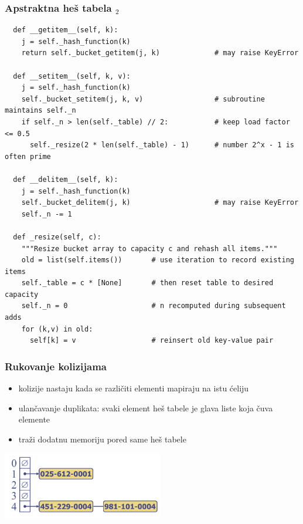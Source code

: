 \documentclass[compress,aspectratio=169]{beamer}
\begin{document}
\begin{frame}
  \frametitle{Apstraktna heš tabela $_2$}
\begin{verbatim}
  def __getitem__(self, k):
    j = self._hash_function(k)
    return self._bucket_getitem(j, k)             # may raise KeyError

  def __setitem__(self, k, v):
    j = self._hash_function(k)
    self._bucket_setitem(j, k, v)                 # subroutine maintains self._n
    if self._n > len(self._table) // 2:           # keep load factor <= 0.5
      self._resize(2 * len(self._table) - 1)      # number 2^x - 1 is often prime

  def __delitem__(self, k):
    j = self._hash_function(k)
    self._bucket_delitem(j, k)                    # may raise KeyError
    self._n -= 1

  def _resize(self, c):
    """Resize bucket array to capacity c and rehash all items."""
    old = list(self.items())       # use iteration to record existing items
    self._table = c * [None]       # then reset table to desired capacity
    self._n = 0                    # n recomputed during subsequent adds
    for (k,v) in old:
      self[k] = v                  # reinsert old key-value pair
\end{verbatim}
\end{frame}

\begin{frame}[fragile]
  \frametitle{Rukovanje kolizijama}
  \begin{itemize}
    \item kolizije nastaju kada se različiti elementi mapiraju na istu ćeliju
    \item ulančavanje duplikata: svaki element heš tabele je glava liste koja čuva elemente
    \item traži dodatnu memoriju pored same heš tabele
  \end{itemize}
  \begin{center}
    \includegraphics[width=7cm]{asp-10-pic08.png}
  \end{center}
\end{frame}
\end{document}
